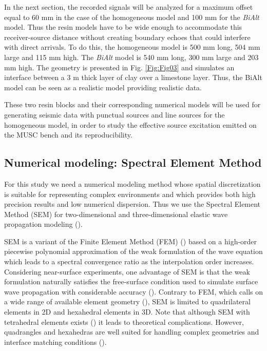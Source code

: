 \documentclass[extra,mreferee]{gji}
\newcommand{\bialt}{\textit{BiAlt} }
\begin{document}
In the next section, the recorded signals will be analyzed for a maximum offset equal to 60 mm in the case of the homogeneous model and 100 mm for the \bialt model. Thus the resin models have to be wide enough to accommodate this receiver-source distance without creating boundary echoes that could interfere with direct arrivals. To do this, the homogeneous model is 500 mm long, 504 mm large and 115 mm high. The \bialt model is 540 mm long, 300 mm large and 203 mm high. The geometry is presented in Fig. \ref{Fig:Fig03} and simulates an interface between a 3 m thick layer of clay over a limestone layer. Thus, the BiAlt model can be seen as a realistic model providing realistic data.

These two resin blocks and their corresponding numerical models will be used for generating seismic data with punctual sources and line sources for the homogeneous model, in order to study the effective source excitation emitted on the MUSC bench and its reproducibility.

\subsection{Numerical modeling: Spectral Element Method}

For this study we need a numerical modeling method whose spatial discretization is suitable for representing complex environments and which provides both high precision results and low numerical dispersion. Thus we use the Spectral Element Method (SEM) for two-dimensional and three-dimensional elastic wave propagation modeling (\cite{komatitsch1998spectral,komatitsch1999spectral,komatitsch2005spectral,Festa_PML_2005}). 

SEM is a variant of the Finite Element Method (FEM) (\cite{Lysmer_FEM_1972,Seron_FEM_1990,Hulbert_FEM_1990,Tromp_SEM_2008}) based on a high-order piecewise polynomial approximation of the weak formulation of the wave equation which leads to a spectral convergence ratio as the interpolation order increases. Considering near-surface experiments, one advantage of SEM is that the weak formulation naturally satisfies the free-surface condition used to simulate surface wave propagation with considerable accuracy (\cite{komatitsch1998spectral,komatitsch1999spectral,komatitsch2005spectral}). Contrary to FEM, which calls on a wide range of available element geometry (\cite{dhatt1984finite}), SEM is limited to quadrilateral elements in 2D and hexahedral elements in 3D. Note that although SEM with tetrahedral elements exists (\cite{komatitsch2001wave}) it leads to theoretical complications. However, quadrangles and hexahedras are well suited for handling complex geometries and interface matching conditions (\cite{Cristini_SEM_2012}). 
\end{document}
